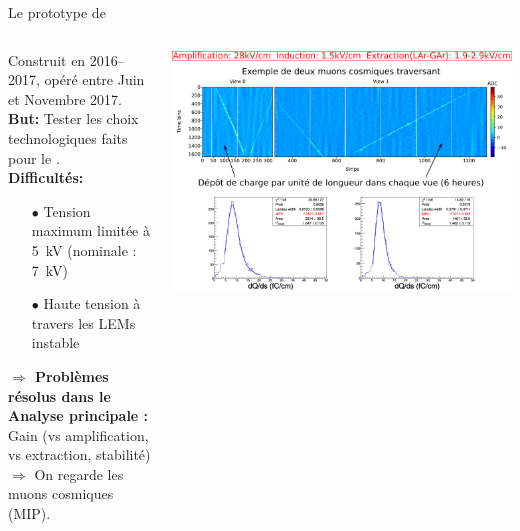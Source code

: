     \begin{frame}{Le prototype de \TOO{}}
    	\begin{scriptsize}
    		\vfill
    		\begin{columns}
    			\begin{column}{0.35\textwidth}
    				Construit en 2016--2017, opéré entre Juin et Novembre 2017.\\
    				\vspace{0.3cm}
    				\textbf{But:} Tester les choix technologiques faits pour le \SSS{}.\\
    				\vspace{0.3cm}
    				\textbf{Difficultés:} 
    				\begin{itemize}
    					\item[$\bullet$] Tension maximum limitée à \SI{5}{\kilo\volt} (nominale : \SI{7}{\kilo\volt})
    					\item[$\bullet$] Haute tension à travers les LEMs instable
    				\end{itemize}
    				\textbf{$\Rightarrow$ Problèmes résolus dans le \SSS{}} \\
    				\vspace{0.3cm}
    				\textbf{Analyse principale :} Gain (vs amplification, vs extraction, stabilité)\\
    				$\Rightarrow$ On regarde les muons cosmiques (MIP).
    			\end{column}\hfill
    			\begin{column}{0.65\textwidth}
    				\includegraphics[width=\textwidth]{./pictures/run840.png}\\
    			\end{column}
    		\end{columns}
	    \end{scriptsize}
    \end{frame}

